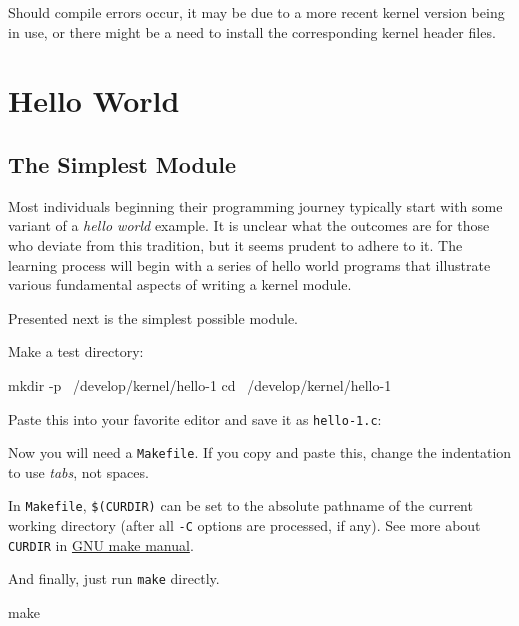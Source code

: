 \documentclass[10pt, oneside]{book}
\begin{document}
Should compile errors occur, it may be due to a more recent kernel version being in use,
or there might be a need to install the corresponding kernel header files.

\section{Hello World}
\label{sec:helloworld}
\subsection{The Simplest Module}
\label{sec:org2d3e245}
Most individuals beginning their programming journey typically start with some variant of a \emph{hello world} example.
It is unclear what the outcomes are for those who deviate from this tradition, but it seems prudent to adhere to it.
The learning process will begin with a series of hello world programs that illustrate various fundamental aspects of writing a kernel module.

Presented next is the simplest possible module.

Make a test directory:
\begin{codebash}
mkdir -p ~/develop/kernel/hello-1
cd ~/develop/kernel/hello-1
\end{codebash}

Paste this into your favorite editor and save it as \verb|hello-1.c|:


Now you will need a \verb|Makefile|. If you copy and paste this, change the indentation to use \textit{tabs}, not spaces.


In \verb|Makefile|, \verb|$(CURDIR)| can be set to the absolute pathname of the current working directory (after all \verb|-C| options are processed, if any).
See more about \verb|CURDIR| in \href{https://www.gnu.org/software/make/manual/make.html}{GNU make manual}.

And finally, just run \verb|make| directly.

\begin{codebash}
make
\end{codebash}
\end{document}
